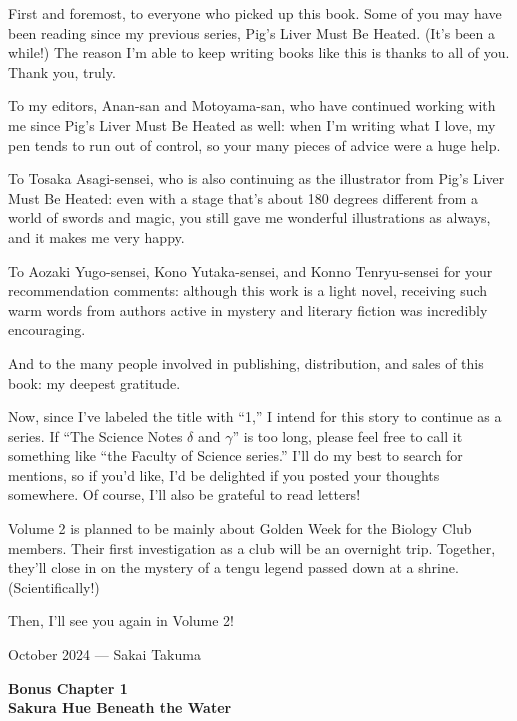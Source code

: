 \documentclass[
    a4paper,
    12pt,
    twoside,
    openany,
    UTF8,
    fontset=windows
]{ctexbook}
\begin{document}
First and foremost, to everyone who picked up this book. Some of you may have been reading since my previous series, Pig's Liver Must Be Heated. (It's been a while!) The reason I'm able to keep writing books like this is thanks to all of you. Thank you, truly.

To my editors, Anan-san and Motoyama-san, who have continued working with me since Pig's Liver Must Be Heated as well: when I'm writing what I love, my pen tends to run out of control, so your many pieces of advice were a huge help.

To Tosaka Asagi-sensei, who is also continuing as the illustrator from Pig's Liver Must Be Heated: even with a stage that's about 180 degrees different from a world of swords and magic, you still gave me wonderful illustrations as always, and it makes me very happy.

To Aozaki Yugo-sensei, Kono Yutaka-sensei, and Konno Tenryu-sensei for your recommendation comments: although this work is a light novel, receiving such warm words from authors active in mystery and literary fiction was incredibly encouraging.

And to the many people involved in publishing, distribution, and sales of this book: my deepest gratitude.

Now, since I've labeled the title with ``1,'' I intend for this story to continue as a series. If ``The Science Notes $\delta$ and $\gamma$'' is too long, please feel free to call it something like ``the Faculty of Science series.'' I'll do my best to search for mentions, so if you'd like, I'd be delighted if you posted your thoughts somewhere. Of course, I'll also be grateful to read letters!

Volume 2 is planned to be mainly about Golden Week for the Biology Club members. Their first investigation as a club will be an overnight trip. Together, they'll close in on the mystery of a tengu legend passed down at a shrine. (Scientifically!)

Then, I'll see you again in Volume 2!
\begin{flushright}
  October 2024 --- Sakai Takuma  
\end{flushright}

\clearpage
\thispagestyle{plain}
\begin{center}
    \large\bfseries
    Bonus Chapter 1\\
        Sakura Hue Beneath the Water
\end{center}
\label{sec:bonus}
\vspace{1cm}
\end{document}
